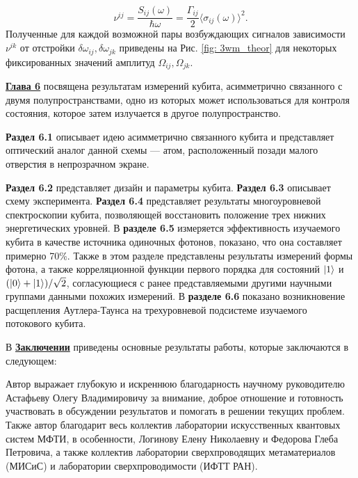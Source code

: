 \begin{equation}
\nu^{ij}=\frac{S_{ij}(\omega)}{\hbar\omega} = \frac{\Gamma_{ij}}{2}\langle\sigma_{ij}(\omega)\rangle^2.
\end{equation}
Полученные для каждой возможной пары возбуждающих сигналов зависимости $\nu^{ik}$ от отстройки $\delta\omega_{ij}, \delta\omega_{jk}$ приведены на Рис. \ref{fig: 3wm_theor} для некоторых фиксированных значений амплитуд $\Omega_{ij}, \Omega_{jk}$. 

\underline{\textbf{Глава 6}} посвящена результатам измерений кубита, асимметрично связанного с двумя полупространствами, одно из которых может использоваться для контроля состояния, которое затем излучается в другое полупространство. 

\textbf{Раздел 6.1} описывает идею асимметрично связанного кубита и представляет оптический аналог данной схемы --- атом, расположенный позади малого отверстия в непрозрачном экране.

\textbf{Раздел 6.2} представляет дизайн и параметры кубита. \textbf{Раздел 6.3} описывает схему эксперимента. \textbf{Раздел 6.4} представляет результаты многоуровневой спектроскопии кубита, позволяющей восстановить положение трех нижних энергетических уровней. В \textbf{разделе 6.5} измеряется эффективность изучаемого кубита в качестве источника одиночных фотонов, показано, что она составляет примерно 70\%. Также в этом разделе представлены результаты измерений формы фотона, а также корреляционной функции первого порядка для состояний $\ket{1}$ и $(\ket{0}+\ket{1})/\sqrt{2}$, согласующиеся с ранее представляемыми другими научными группами данными похожих измерений. В \textbf{разделе 6.6} показано возникновение расщепления Аутлера-Таунса на трехуровневой подсистеме изучаемого потокового кубита. 
%
%

В \underline{\textbf{Заключении}} приведены основные результаты работы, которые заключаются в следующем:


Автор выражает глубокую и искреннюю благодарность научному руководителю Астафьеву Олегу Владимировичу за внимание, доброе отношение и готовность участвовать в обсуждении результатов и помогать в решении текущих проблем. Также автор благодарит весь коллектив лаборатории искусственных квантовых систем МФТИ, в особенности, Логинову Елену Николаевну и Федорова Глеба Петровича, а также коллектив лаборатории сверхпроводящих метаматериалов (МИСиС) и лаборатории сверхпроводимости (ИФТТ РАН). 

